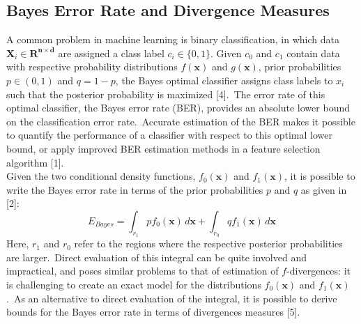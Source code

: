 \documentclass{article}
\begin{document}
	\subsection{\small Bayes Error Rate and Divergence Measures}
	\indent A common problem in machine learning is binary classification, in which data $\textbf{X}_i\in \mathbf{R^{n \times d}}$ are assigned a class label $c_i \in \{0,1\}$.
	Given $c_0$ and $c_1$ contain data with respective probability distributions $f(\textbf{x})$ and $g(\textbf{x})$, prior probabilities $p \in (0,1)$ and $q=1-p$, the Bayes optimal classifier assigns class labels to $x_i$ such that the posterior probability is maximized [4].\ The error rate of this optimal classifier, the Bayes error rate (BER), provides an absolute lower bound on the classification error rate.\ Accurate estimation of the BER makes it possible to quantify the performance of a classifier with respect to this optimal lower bound, or apply improved BER estimation methods in a feature selection algorithm [1]. 
	\\ [0.5ex]
	\indent Given the two conditional density functions, $f_0(\textbf{x})$ and $f_1(\textbf{x})$, it is possible to write the Bayes error rate in terms of the prior probabilities $p$ and $q$ as given in [2]:
	\begin{equation} E_{Bayes}=\int_{r_1} pf_0(\textbf{x}) \,d\textbf{x} + \int_{r_0} qf_1(\textbf{x}) \,d\textbf{x} \end{equation}
	\indent Here, $r_1$ and $r_0$ refer to the regions where the respective posterior probabilities are larger.\ Direct evaluation of this integral can be quite involved and impractical, and poses similar problems to that of estimation of $f$-divergences: it is challenging to create an exact model for the distributions $f_0(\textbf{x})$ and $f_1(\textbf{x})$.\ As an alternative to direct evaluation of the integral, it is possible to derive bounds for the Bayes error rate in terms of divergences measures [5]. 
	\\ [0.5ex]	
\end{document}

